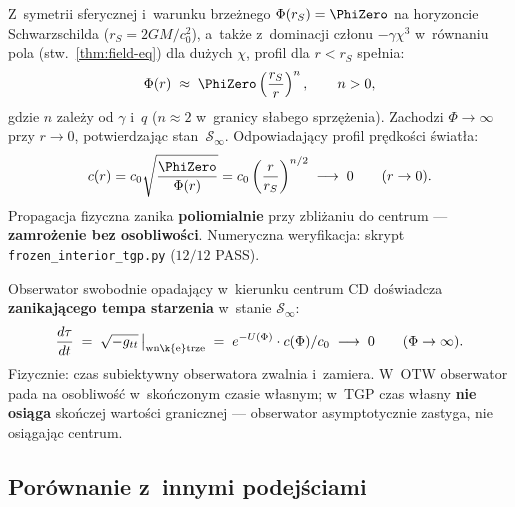 \begin{remark}\label{rem:Phi-interior}
Z~symetrii sferycznej i~warunku brze\.znego $\Phi(r_S) = \PhiZero$
na horyzoncie Schwarzschilda ($r_S = 2GM/c_0^2$), a~tak\.ze
z~dominacji cz\l{}onu $-\gamma\chi^3$ w~r\'ownaniu pola
(stw.~\ref{thm:field-eq}) dla du\.zych $\chi$, profil
dla $r < r_S$ spe\l{}nia:
\begin{equation}\label{eq:Phi-interior-profile}
  \Phi(r) \;\approx\; \PhiZero \left(\frac{r_S}{r}\right)^n,
  \qquad n > 0,
\end{equation}
gdzie $n$ zale\.zy od $\gamma$ i~$q$ ($n \approx 2$ w~granicy s\l{}abego
sprz\k{e}\.zenia). Zachodzi $\Phi \to \infty$ przy $r \to 0$,
potwierdzaj\k{a}c stan~$\mathcal{S}_\infty$.
Odpowiadaj\k{a}cy profil pr\k{e}dko\'sci \'swiat\l{}a:
\begin{equation}\label{eq:c-interior}
  c(r) = c_0 \sqrt{\frac{\PhiZero}{\Phi(r)}}
       = c_0 \left(\frac{r}{r_S}\right)^{n/2}
  \;\longrightarrow\; 0
  \qquad (r \to 0).
\end{equation}
Propagacja fizyczna zanika \textbf{poliomialnie} przy zbli\.zaniu
do centrum --- \textbf{zamro\.zenie bez osobliwo\'sci}.
Numeryczna weryfikacja: skrypt
\texttt{frozen\_interior\_tgp.py} ($12/12$ PASS).
\end{remark}

\begin{proposition}\label{prop:proper-time-infty}
Obserwator swobodnie opadaj\k{a}cy w~kierunku centrum CD
do\'swiadcza \textbf{zanikaj\k{a}cego tempa starzenia}
w~stanie $\mathcal{S}_\infty$:
\begin{equation}\label{eq:proper-time-infty}
  \frac{d\tau}{dt}
  \;=\; \sqrt{-g_{tt}}\,\big|_{\mathrm{wn\k{e}trze}}
  \;=\; e^{-U(\Phi)}\cdot c(\Phi)/c_0
  \;\longrightarrow\; 0
  \qquad (\Phi \to \infty).
\end{equation}
Fizycznie: czas subiektywny obserwatora zwalnia i~zamiera.
W~OTW obserwator pada na osobliwo\'s\'c w~sko\'nczonym czasie w\l{}asnym;
w~TGP czas w\l{}asny \textbf{nie osi\k{a}ga} sko\'nczej warto\'sci
granicznej --- obserwator asymptotycznie zastyga,
nie osi\k{a}gaj\k{a}c centrum.
\end{proposition}

\subsection{Por\'ownanie z~innymi podej\'sciami}\label{ssec:cd-inne}

